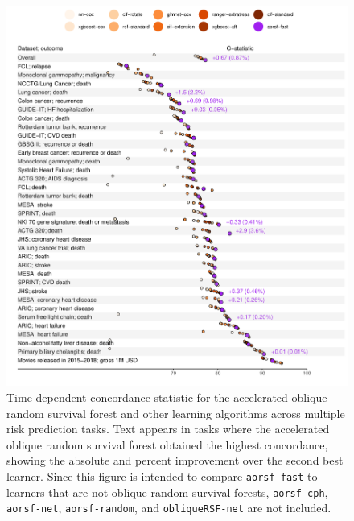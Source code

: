 \documentclass[12pt]{article}\usepackage[]{graphicx}\usepackage[]{xcolor}
\makeatletter
\def\maxwidth{ %
  \ifdim\Gin@nat@width>\linewidth
    \linewidth
  \else
    \Gin@nat@width
  \fi
}
\newenvironment{knitrout}{}{} %
\makeatother
\begin{document}
\begin{knitrout}
\color{fgcolor}\begin{figure}
\includegraphics[width=\maxwidth]{figure/bm_pred_viz_cstat-1} \caption[Time-dependent concordance statistic for the accelerated oblique random survival forest and other learning algorithms across multiple risk prediction tasks]{Time-dependent concordance statistic for the accelerated oblique random survival forest and other learning algorithms across multiple risk prediction tasks. Text appears in tasks where the accelerated oblique random survival forest obtained the highest concordance, showing the absolute and percent improvement over the second best learner. Since this figure is intended to compare \texttt{aorsf-fast} to learners that are not oblique random survival forests, \texttt{aorsf-cph}, \texttt{aorsf-net}, \texttt{aorsf-random}, and \texttt{obliqueRSF-net} are not included.}\label{fig:bm_pred_viz_cstat}
\end{figure}

\end{knitrout}
\end{document}

